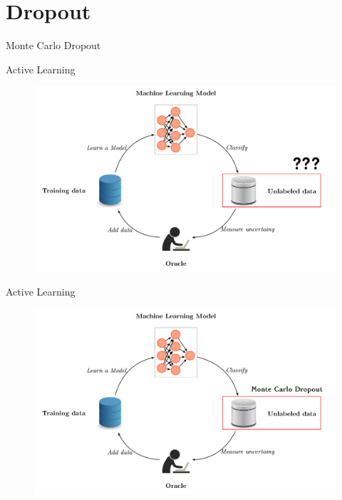 \documentclass[10pt]{beamer}
\begin{document}
\section{Dropout}

\begin{frame}[fragile]{Monte Carlo Dropout}
    
\end{frame}

\begin{frame}[fragile]{Active Learning}
    \begin{figure}[htp]
        \centering
        \includegraphics[scale=0.3]{images/active_learning_uncertainty.png}
    \end{figure}
\end{frame}

\begin{frame}[fragile]{Active Learning}
    \begin{figure}[htp]
        \centering
        \includegraphics[scale=0.3]{images/active_learning_uncertainty_dropout.png}
    \end{figure}
\end{frame}
\end{document}
